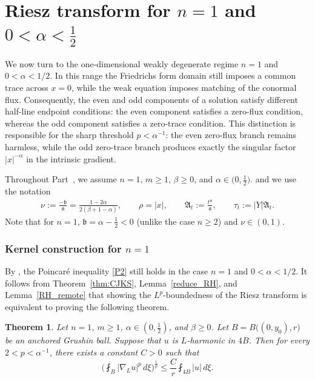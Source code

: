 \documentclass[12pt]{amsart}
\newtheorem{theorem}{Theorem}[section]
\begin{document}
\part{Riesz transform for \texorpdfstring{$n=1$}{n=1} and \texorpdfstring{$0<\alpha<\frac{1}{2}$}{0<alpha<1/2}}\label{part2}

We now turn to the one-dimensional weakly degenerate regime $n=1$ and
$0<\alpha<1/2$. In this range the Friedrichs form domain still imposes a common
trace across $x=0$, while the weak equation imposes matching of the conormal
flux. Consequently, the even and odd components of a solution satisfy different
half-line endpoint conditions: the even component satisfies a zero-flux condition,
whereas the odd component satisfies a zero-trace condition. This distinction is
responsible for the sharp threshold $p<\alpha^{-1}$: the even zero-flux branch
remains harmless, while the odd zero-trace branch produces exactly the singular
factor $|x|^{-\alpha}$ in the intrinsic gradient.





Throughout Part~\ref{part2}, we assume $n=1$, $m\ge 1$, $\beta\ge 0$, and $\alpha \in \big(0,\frac{1}{2}\big)$. and we use the notation
\begin{align*}
\nu:= \frac{-\mathfrak b}{\mathfrak a} = \frac{1-2\alpha}{2(\beta+1-\alpha)},\qquad \rho = |x|, \qquad \mathfrak A_t:= \frac{t^{\mathfrak a}}{\mathfrak a},\qquad \tau_t := |Y| \mathfrak A_t.
\end{align*}
Note that for $n=1$, $\mathfrak b = \alpha-\frac{1}{2} <0$ (unlike the case $n\ge 2$) and $\nu\in (0,1)$.



\section{Kernel construction for \texorpdfstring{$n=1$}{n=1}}\label{sec:kernel:n=1:alpha<1/2}

By \cite[Theorem~1.1]{RS2}, the Poincar\'e inequality \eqref{P2} still holds in the case $n=1$ and $0<\alpha<1/2$. It follows from Theorem~\ref{thm:CJKS}, Lemma~\ref{reduce_RH}, and Lemma~\ref{RH_remote} that showing the $L^p$-boundedness of the Riesz transform is equivalent to proving the following theorem.





\begin{theorem}\label{thm:RH2}
Let $n = 1$, $m \ge 1$, $\alpha\in (0,\frac{1}{2})$, and $\beta \ge 0$. Let $B=B\big((0,y_0), r\big)$ be an anchored Grushin ball. Suppose that $u$ is $L$-harmonic in $4B$. Then for every $2<p < \alpha^{-1}$, there exists a constant $C>0$ such that
\begin{equation*}
    \biggl( \fint_B |\nabla_L u|^p \, d\xi \biggr)^{\!\frac{1}{p}} \le  \frac{C}{r} \fint_{4B} |u| \, d\xi.
\end{equation*}
\end{theorem}
\end{document}
